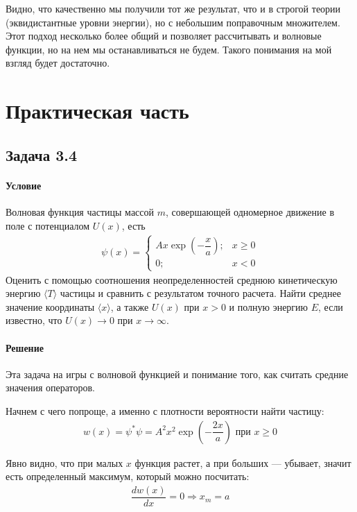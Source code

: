 \documentclass[12pt]{article}
\begin{document}
Видно, что качественно мы получили тот же результат, что и в строгой теории (эквидистантные уровни энергии), но с  небольшим поправочным множителем. Этот подход несколько более общий и позволяет рассчитывать и волновые функции, но на нем мы останавливаться не будем. Такого понимания на мой взгляд будет достаточно.



\section{Практическая часть}
\subsection{Задача 3.4}
\label{task_3.4}
\paragraph{Условие}
Волновая функция частицы массой $m$, совершающей одномерное движение в поле с потенциалом $U(x)$, есть 
\begin{gather*}
\psi(x) = 
    \begin{cases}
        Ax\exp{\left( -\dfrac{x}{a}\right)}; &x \ge 0\\
        0; &x<0
    \end{cases}
\end{gather*}
Оценить с помощью соотношения неопределенностей среднюю кинетическую энергию $\langle T \rangle$ частицы и сравнить с результатом точного расчета. Найти среднее значение координаты $\langle x \rangle$, а также $U(x)$ при $x>0$ и полную энергию $E$, если известно, что $U(x) \rightarrow 0$ при $x \rightarrow \infty$.

\paragraph{Решение}
Эта задача на игры с волновой функцией и понимание того, как считать средние значения операторов.

Начнем с чего попроще, а именно с плотности вероятности найти частицу:
\begin{gather*}
    w(x) = \psi^*\psi = A^2x^2\exp{\left( -\dfrac{2x}{a}\right)} \text{ при }  x \ge 0
\end{gather*}

Явно видно, что при малых $x$ функция растет, а при больших --- убывает, значит есть определенный максимум, который можно посчитать:
\begin{gather*}
    \dfrac{dw(x)}{dx} = 0 \Rightarrow x_m = a
\end{gather*}
\end{document}
